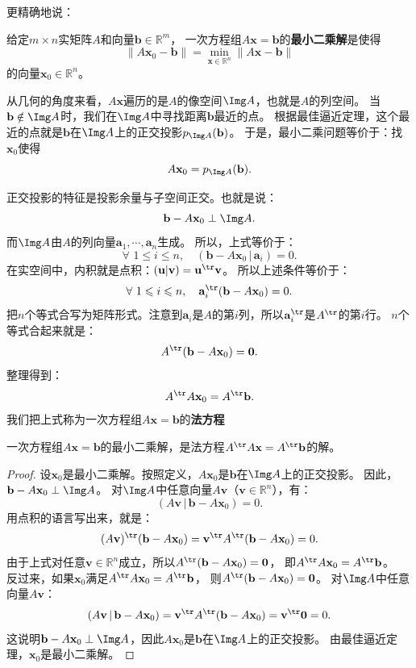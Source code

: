 \documentclass[12pt,UTF8,fontset=none]{ctexbook}
\begin{document}
更精确地说：
\begin{df}\label{df:7_5}
给定$m \times n$实矩阵$A$和向量$\mathbf{b} \in \mathbb{R}^m$，
一次方程组$A\mathbf{x} = \mathbf{b}$的\textbf{最小二乘解}是使得
$$ \|A\mathbf{x}_0 - \mathbf{b}\| = \min_{\mathbf{x} \in \mathbb{R}^n} \|A\mathbf{x} - \mathbf{b}\| $$
的向量$\mathbf{x}_0 \in \mathbb{R}^n$。
\end{df}

从几何的角度来看，$A\mathbf{x}$遍历的是$A$的像空间$\Img A$，也就是$A$的列空间。
当$\mathbf{b} \notin \Img A$时，我们在$\Img A$中寻找距离$\mathbf{b}$最近的点。
根据最佳逼近定理，这个最近的点就是$\mathbf{b}$在$\Img A$上的正交投影$p_{\Img A}(\mathbf{b})$。
于是，最小二乘问题等价于：找$\mathbf{x}_0$使得
$$ A\mathbf{x}_0 = p_{\Img A}(\mathbf{b}). $$

正交投影的特征是投影余量与子空间正交。也就是说：
$$ \mathbf{b} - A\mathbf{x}_0 \perp \Img A. $$
而$\Img A$由$A$的列向量$\mathbf{a}_1, \cdots, \mathbf{a}_n$生成。
所以，上式等价于：
$$ \forall \,\, 1 \leqslant i \leqslant n, \quad (\mathbf{b} - A\mathbf{x}_0 \,|\, \mathbf{a}_i) = 0. $$
在实空间中，内积就是点积：$(\mathbf{u}|\mathbf{v}) = \mathbf{u}^{\tr}\mathbf{v}$。
所以上述条件等价于：
$$ \forall \,\, 1 \leqslant i \leqslant n, \quad \mathbf{a}_i^{\tr}(\mathbf{b} - A\mathbf{x}_0) = 0. $$
把$n$个等式合写为矩阵形式。注意到$\mathbf{a}_i$是$A$的第$i$列，所以$\mathbf{a}_i^{\tr}$是$A^{\tr}$的第$i$行。
$n$个等式合起来就是：
$$ A^{\tr}(\mathbf{b} - A\mathbf{x}_0) = \mathbf{0}. $$
整理得到：
$$ A^{\tr} A \mathbf{x}_0 = A^{\tr} \mathbf{b}. $$
我们把上式称为一次方程组$A\mathbf{x} = \mathbf{b}$的\textbf{法方程}

\begin{pp}\label{pp:7_10}
一次方程组$A\mathbf{x} = \mathbf{b}$的最小二乘解，是法方程$A^{\tr} A \mathbf{x} = A^{\tr} \mathbf{b}$的解。
\end{pp}

\begin{proof} %
设$\mathbf{x}_0$是最小二乘解。按照定义，$A\mathbf{x}_0$是$\mathbf{b}$在$\Img A$上的正交投影。
因此，$\mathbf{b} - A\mathbf{x}_0 \perp \Img A$。
对$\Img A$中任意向量$A\mathbf{v}$（$\mathbf{v} \in \mathbb{R}^n$），有：
$$ (A\mathbf{v} \,|\, \mathbf{b} - A\mathbf{x}_0) = 0. $$
用点积的语言写出来，就是：
$$ (A\mathbf{v})^{\tr}(\mathbf{b} - A\mathbf{x}_0) = \mathbf{v}^{\tr} A^{\tr}(\mathbf{b} - A\mathbf{x}_0) = 0. $$
由于上式对任意$\mathbf{v} \in \mathbb{R}^n$成立，所以$A^{\tr}(\mathbf{b} - A\mathbf{x}_0) = \mathbf{0}$，
即$A^{\tr} A \mathbf{x}_0 = A^{\tr} \mathbf{b}$。\\
反过来，如果$\mathbf{x}_0$满足$A^{\tr} A \mathbf{x}_0 = A^{\tr} \mathbf{b}$，
则$A^{\tr}(\mathbf{b} - A\mathbf{x}_0) = \mathbf{0}$。
对$\Img A$中任意向量$A\mathbf{v}$：
$$ (A\mathbf{v} \,|\, \mathbf{b} - A\mathbf{x}_0) = \mathbf{v}^{\tr} A^{\tr}(\mathbf{b} - A\mathbf{x}_0) = \mathbf{v}^{\tr} \mathbf{0} = 0. $$
这说明$\mathbf{b} - A\mathbf{x}_0 \perp \Img A$，因此$A\mathbf{x}_0$是$\mathbf{b}$在$\Img A$上的正交投影。
由最佳逼近定理，$\mathbf{x}_0$是最小二乘解。
\end{proof}
\end{document}
